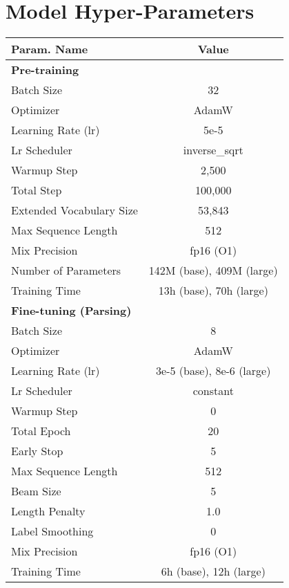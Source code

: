 \documentclass[11pt]{article}
\begin{document}



\clearpage
\appendix
\label{sec:appendix}

\section{Model Hyper-Parameters}\label{appendix:para}
\begin{table}[!t]
    \centering
    \small
    \begin{tabular}{l|c}
        \toprule
        \textbf{Param. Name} & \textbf{Value} \\
        \midrule
        \textbf{Pre-training} & \\
        Batch Size &32 \\
        Optimizer & AdamW \\
        Learning Rate (lr) & 5e-5 \\
        Lr Scheduler & inverse\_sqrt  \\
        Warmup Step & 2,500 \\
        Total Step & 100,000 \\
        Extended Vocabulary Size & 53,843 \\
        Max Sequence Length & 512 \\
        Mix Precision & fp16 (O1) \\
        Number of Parameters &142M (base), 409M (large) \\
        Training Time & 13h (base), 70h (large) \\
        \midrule
        \textbf{Fine-tuning (Parsing)} & \\
        Batch Size & 8 \\
        Optimizer & AdamW \\
        Learning Rate (lr) & 3e-5 (base), 8e-6 (large) \\
        Lr Scheduler & constant  \\
        Warmup Step & 0 \\
        Total Epoch & 20 \\
        Early Stop & 5 \\
        Max Sequence Length & 512 \\
        Beam Size & 5 \\
        Length Penalty & 1.0 \\
        Label Smoothing & 0 \\
        Mix Precision & fp16 (O1) \\
        Training Time & 6h (base), 12h (large) \\

\end{tabular}
\end{table}
\end{document}
